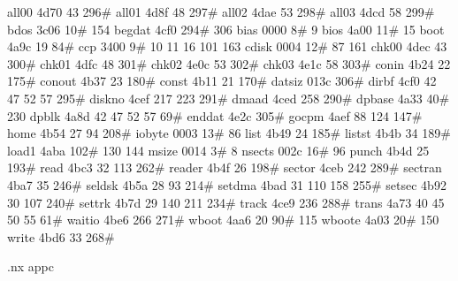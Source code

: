 all00          4d70      43     296#
all01          4d8f      48     297#
all02          4dae      53     298#
all03          4dcd      58     299#
bdos           3c06      10#    154
begdat         4cf0     294#    306
bias           0000       8#      9
bios           4a00      11#     15
boot           4a9c      19      84#
ccp            3400       9#     10      11      16     101     163
cdisk          0004      12#     87     161
chk00          4dec      43     300#
chk01          4dfc      48     301#
chk02          4e0c      53     302#
chk03          4e1c      58     303#
conin          4b24      22     175#
conout         4b37      23     180#
const          4b11      21     170#
datsiz         013c     306#
dirbf          4cf0      42      47      52      57     295#
diskno         4cef     217     223     291#
dmaad          4ced     258     290#
dpbase         4a33      40#    230
dpblk          4a8d      42      47      52      57      69#
enddat         4e2c     305#
gocpm          4aef      88     124     147#
home           4b54      27      94     208#
iobyte         0003      13#     86
list           4b49      24     185#
listst         4b4b      34     189#
load1          4aba     102#    130     144
msize          0014       3#      8
nsects         002c      16#     96
punch          4b4d      25     193#
read           4bc3      32     113     262#
reader         4b4f      26     198#
sector         4ceb     242     289#
sectran        4ba7      35     246#
seldsk         4b5a      28      93     214#
setdma         4bad      31     110     158     255#
setsec         4b92      30     107     240#
settrk         4b7d      29     140     211     234#
track          4ce9     236     288#
trans          4a73      40      45      50      55      61#
waitio         4be6     266     271#
wboot          4aa6      20      90#    115
wboote         4a03      20#    150
write          4bd6      33     268#


.nx appc
